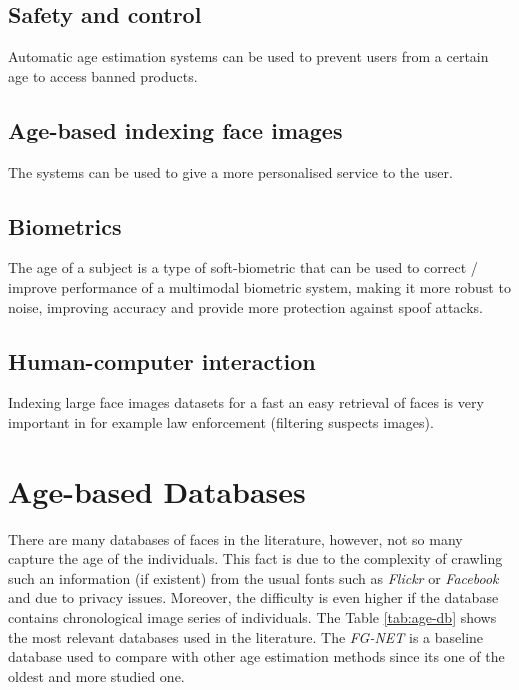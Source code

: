 \subsection{Safety and control}
Automatic age estimation systems can be used to prevent users from a certain age to access banned products.

\subsection{Age-based indexing face images}
The systems can be used to give a more personalised service to the user.

\subsection{Biometrics}
The age of a subject is a type of soft-biometric \cite{conf/icba/JainDN04} that can be used to correct / improve performance of a multimodal biometric system, making it more robust to noise, improving accuracy and provide more protection against spoof attacks.

\subsection{Human-computer interaction}
Indexing large face images datasets for a fast an easy retrieval of faces is very important in for example law enforcement (filtering suspects images).


\section{Age-based Databases}
There are many databases of faces in the literature, however, not so many capture the age of the individuals. This fact is due to the complexity of crawling such an information (if existent) from the usual fonts such as \textit{Flickr} or \textit{Facebook} and due to privacy issues. Moreover, the difficulty is even higher if the database contains chronological image series of individuals. The Table \ref{tab:age-db} shows the most relevant databases used in the literature. The \textit{FG-NET} is a baseline database used to compare with other age estimation methods since its one of the oldest and more studied one.
 
